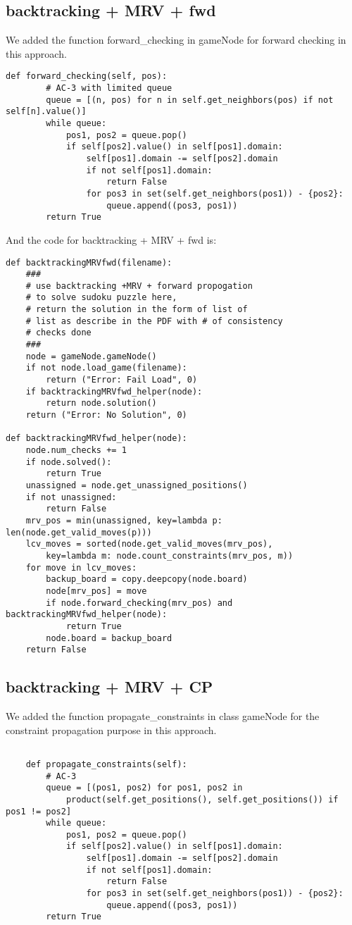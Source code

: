 \documentclass[11pt]{article}
\begin{document}
\subsection{backtracking + MRV + fwd}

We added the function forward\_checking in gameNode for forward checking in this approach.
\lstset{language=Python}
\begin{lstlisting}[frame=single]
	def forward_checking(self, pos):
		# AC-3 with limited queue
		queue = [(n, pos) for n in self.get_neighbors(pos) if not self[n].value()]
		while queue:
			pos1, pos2 = queue.pop()
			if self[pos2].value() in self[pos1].domain:
				self[pos1].domain -= self[pos2].domain
				if not self[pos1].domain:
					return False
				for pos3 in set(self.get_neighbors(pos1)) - {pos2}:
					queue.append((pos3, pos1))
		return True
\end{lstlisting}

And the code for backtracking + MRV + fwd is:
\lstset{language=Python}
\begin{lstlisting}[frame=single]
def backtrackingMRVfwd(filename):
	###
	# use backtracking +MRV + forward propogation
	# to solve sudoku puzzle here,
	# return the solution in the form of list of
	# list as describe in the PDF with # of consistency
	# checks done
	###
	node = gameNode.gameNode()
	if not node.load_game(filename):
		return ("Error: Fail Load", 0)
	if backtrackingMRVfwd_helper(node):
		return node.solution()
	return ("Error: No Solution", 0)

def backtrackingMRVfwd_helper(node):
	node.num_checks += 1
	if node.solved():
		return True
	unassigned = node.get_unassigned_positions()
	if not unassigned:
		return False
	mrv_pos = min(unassigned, key=lambda p: len(node.get_valid_moves(p)))
	lcv_moves = sorted(node.get_valid_moves(mrv_pos),
		key=lambda m: node.count_constraints(mrv_pos, m))
	for move in lcv_moves:
		backup_board = copy.deepcopy(node.board)
		node[mrv_pos] = move
		if node.forward_checking(mrv_pos) and backtrackingMRVfwd_helper(node):
			return True
		node.board = backup_board
	return False
\end{lstlisting}


\subsection{backtracking + MRV + CP}

We added the function propagate\_constraints in class gameNode for the constraint propagation purpose in this approach.
\lstset{language=Python}
\begin{lstlisting}[frame=single]

	def propagate_constraints(self):
		# AC-3
		queue = [(pos1, pos2) for pos1, pos2 in
			product(self.get_positions(), self.get_positions()) if pos1 != pos2]
		while queue:
			pos1, pos2 = queue.pop()
			if self[pos2].value() in self[pos1].domain:
				self[pos1].domain -= self[pos2].domain
				if not self[pos1].domain:
					return False
				for pos3 in set(self.get_neighbors(pos1)) - {pos2}:
					queue.append((pos3, pos1))
		return True
\end{lstlisting}
\end{document}
